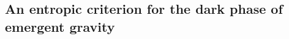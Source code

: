 \documentclass[a4paper,12pt]{article}
\begin{document}
 
 \subsection{An entropic criterion for the dark phase of emergent gravity}




 
\end{document}
